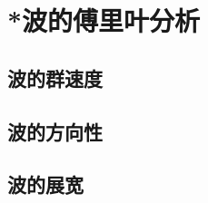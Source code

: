 

\section{*波的傅里叶分析}\label{9-5}

\subsection{波的群速度}\label{9-5-1}

\subsection{波的方向性}\label{9-5-2}

\subsection{波的展宽}\label{9-5-3}